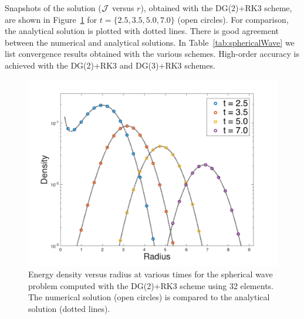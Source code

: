 \documentclass[10pt,preprint]{aastex}
\begin{document}
Snapshots of the solution ($\mathcal{J}$ versus $r$), obtained with the DG(2)+RK3 scheme, are shown in Figure~\ref{fig:sphericalWave} for $t=\{2.5,3.5,5.0,7.0\}$ (open circles).  
For comparison, the analytical solution is plotted with dotted lines.  
There is good agreement between the numerical and analytical solutions.  
In Table~\ref{tab:sphericalWave} we list convergence results obtained with the various schemes.  
High-order accuracy is achieved with the DG(2)+RK3 and DG(3)+RK3 schemes.  

\begin{figure}
  \begin{center}
    \includegraphics[scale=0.78]{./Figures/GaussianSphericalWave1D}
  \end{center}
  \caption{Energy density versus radius at various times for the spherical wave problem computed with the DG(2)+RK3 scheme using 32 elements.  The numerical solution (open circles) is compared to the analytical solution (dotted lines).  }
  \label{fig:sphericalWave}
\end{figure}
\end{document}
